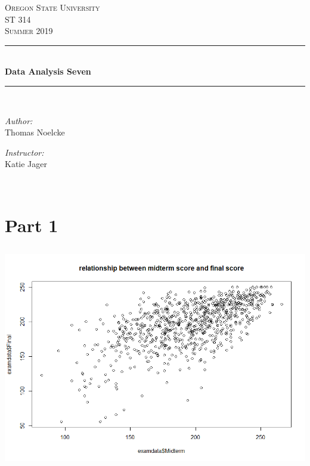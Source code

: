 \documentclass[letterpaper, onecolumn,10pt]{IEEEtran}
\begin{document}
    \begin{titlepage}
    \newcommand{\HRule}{\rule{\linewidth}{0.5mm}}
    \center
    \textsc{\Large Oregon State University}\\[1.5cm]
    \textsc{\Large ST 314}\\[0.5cm]
    \textsc{\Large Summer 2019}\\[0.5cm]
    \HRule \\[0.4cm]
    { \huge \bfseries Data Analysis Seven}\\[0.4cm] %
    \HRule \\[1.5cm]
    \begin{minipage}{0.4\textwidth}
        \begin{flushleft} \large
        \emph{Author:}\\
        Thomas Noelcke
        \end{flushleft}
    \end{minipage}
    \begin{minipage}{0.4\textwidth}
        \begin{flushright} \large
        \emph{Instructor:} \\
        Katie Jager\\
        \end{flushright}
    \end{minipage}\\[2cm]
		\end{titlepage}
        
        \section{Part 1}
            \subsection{}
            \includegraphics[width=\textwidth]{Week7/Images/scatterplot.png}
            
\end{document}

